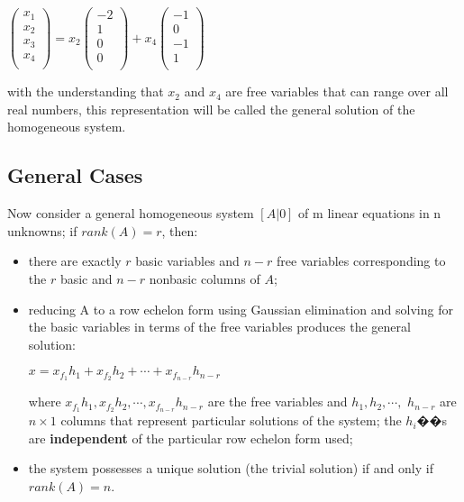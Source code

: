 \documentclass[UTF8,a4paper, 10pt, openany]{svmono}
\begin{document}
\begin{center}
$\left(
\begin{array}{c}
x_{1} \\ 
x_{2} \\
x_{3} \\
x_{4} \\
\end{array}
\right)=x_{2}
\left(
\begin{array}{c}
-2 \\ 
1 \\
0 \\
0 \\
\end{array}
\right)+x_{4}
\left(
\begin{array}{c}
-1 \\ 
0 \\
-1 \\
1 \\
\end{array}
\right)$
\end{center}
with the understanding that $x_2$ and $x_4$ are free variables that can range over all real numbers, this representation will be called the general solution of the homogeneous system.
\subsection{General Cases}
Now consider a general homogeneous system $[A|0]$ of m linear equations in n unknowns; if $rank(A) = r$, then:
\begin{itemize}
\item there are exactly $r$ basic variables and $n - r$ free variables corresponding to the $r$ basic and $n - r$ nonbasic columns of $A$;
\item reducing A to a row echelon form using Gaussian elimination and
solving for the basic variables in terms of the free variables produces
the general solution:
\begin{center}
$x=x_{f_{1}}h_{1}+x_{f_{2}}h_{2}+\cdots +x_{f_{n-r}}h_{n-r}$
\end{center}
where $x_{f_{1}}h_{1}, x_{f_{2}}h_{2},\cdots , x_{f_{n-r}}h_{n-r}$ are the free variables and $h_{1}, h_{2},\cdots ,$ $h_{n-r}$ are $n\times 1$ columns that represent particular solutions of the system; the $h_i$��s are \textbf{independent} of the particular row echelon form used;
\item the system possesses a unique solution (the trivial solution) if and
only if $rank(A) = n$.
\end{itemize}
\end{document}
